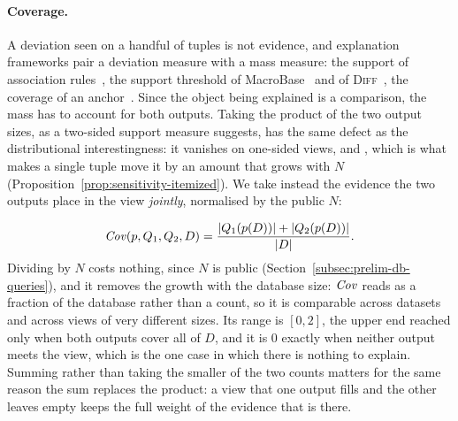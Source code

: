 \paragraph{Coverage.}
A deviation seen on a handful of tuples is not evidence, and explanation frameworks pair a deviation measure with a mass measure: the support of association rules~\cite{AgrawalIS93}, the support threshold of MacroBase~\cite{MacroBase} and of \textsc{Diff}~\cite{DIFF}, the coverage of an anchor~\cite{Anchors}.
Since the object being explained is a comparison, the mass has to account for both outputs.
Taking the product of the two output sizes, as a two-sided support measure suggests, has the same defect as the distributional interestingness: it vanishes on one-sided views, and , which is what makes a single tuple move it by an amount that grows with $N$ (Proposition~\ref{prop:sensitivity-itemized}).
We take instead the evidence the two outputs place in the view \emph{jointly}, normalised by the public $N$:

\begin{equation}
\mathit{Cov}(p,Q_1,Q_2,D)=\frac{|Q_1(p(D))|+|Q_2(p(D))|}{|D|}.
\label{eq:coverage-proxy}
\end{equation}
Dividing by $N$ costs nothing, since $N$ is public (Section~\ref{subsec:prelim-db-queries}), and it removes the growth with the database size: $\mathit{Cov}$ reads as a fraction of the database rather than a count, so it is comparable across datasets and across views of very different sizes.
Its range is $[0,2]$, the upper end reached only when both outputs cover all of $D$, and it is $0$ exactly when neither output meets the view, which is the one case in which there is nothing to explain.
Summing rather than taking the smaller of the two counts matters for the same reason the sum replaces the product: a view that one output fills and the other leaves empty keeps the full weight of the evidence that is there.

